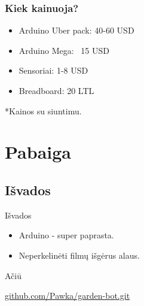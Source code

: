 \documentclass[12pt,a4paper]{beamer}
\begin{document}
\begin{frame}
    \frametitle{Kiek kainuoja?}

    \begin{itemize}
        \item Arduino Uber pack: 40-60 USD
        \item Arduino Mega: ~15 USD
        \item Sensoriai: 1-8 USD
        \item Breadboard: 20 LTL
    \end{itemize}
    *Kainos su siuntimu.
\end{frame}

\section{Pabaiga}

\subsection{Išvados}
\begin{frame}{Išvados}
    \begin{itemize}
        \item Arduino - super paprasta.
        \item Neperkelinėti filmų išgėrus alaus.
    \end{itemize}
\end{frame}

\begin{frame}
	\begin{center}
        {\Huge Ačiū}
	\end{center}
    \begin{center}
        \href{http://github.com/Pawka/garden-bot.git}{github.com/Pawka/garden-bot.git}
    \end{center}
\end{frame}
\end{document}

